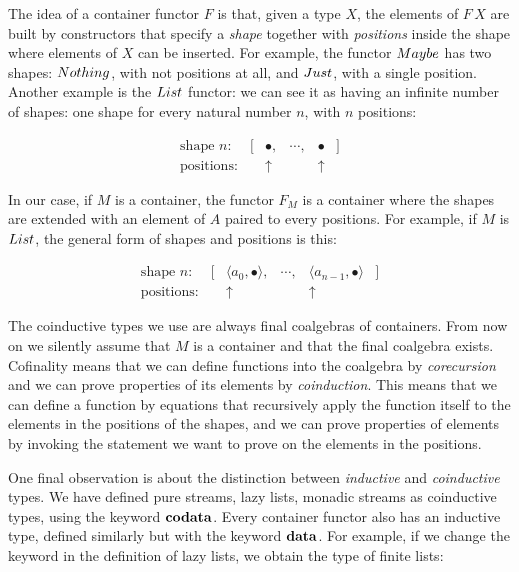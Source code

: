 The idea of a container functor $F$ is that, given a type $X$, the elements of $F\,X$ are built by constructors that specify a {\em shape} together with {\em positions} inside the shape where elements of $X$ can be inserted.
For example, the functor $\maybe$ has two shapes: $\nothing$, with not positions at all, and $\just$, with a single position.
Another example is the $\lstsym$ functor: we can see it as having an infinite number of shapes: one shape for every natural number $n$, with $n$ positions:

$$
\begin{array}{llcll}
\mbox{shape $n$: } \quad [ & \bullet,  & \cdots ,  & \bullet & ]\\
\mbox{positions: }     & \uparrow &       & \uparrow
\end{array}
$$

In our case, if $M$ is a container, the functor $F_M$ is a container where the shapes are extended with an element of $A$ paired to every positions.
For example, if $M$ is $\lstsym$, the general form of shapes and positions is this:

$$
\begin{array}{lrcrl}
\mbox{shape $n$: } \quad [ & \langle a_0, \bullet\rangle,  
                           & \cdots ,  
                           & \langle a_{n-1}, \bullet \rangle & ]\\
\mbox{positions: }     & \uparrow\hspace{6pt} &       & \uparrow\hspace{4pt}
\end{array}
$$

The coinductive types we use are always final coalgebras of containers.
From now on we silently assume that $M$ is a container and that the final coalgebra exists.
Cofinality means that we can define functions into the coalgebra by {\em corecursion} and we can prove properties of its elements by {\em coinduction}.
This means that we can define a function by equations that recursively apply the function itself to the elements in the positions of the shapes, and we can prove properties of elements by invoking the statement we want to prove on the elements in the positions.


One final observation is about the distinction between {\em inductive} and {\em coinductive} types.
We have defined pure streams, lazy lists, monadic streams as coinductive types, using the keyword $\mathbf{codata}$.
Every container functor also has an inductive type, defined similarly but with the keyword $\mathbf{data}$.
For example, if we change the keyword in the definition of lazy lists, we obtain the type of finite lists:

